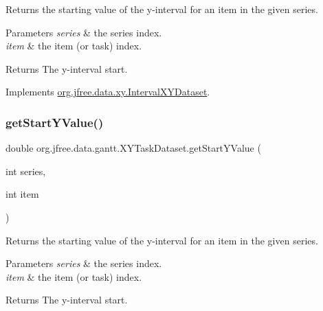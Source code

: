 Returns the starting value of the y-\/interval for an item in the given series.


\begin{DoxyParams}{Parameters}
{\em series} & the series index. \\
\hline
{\em item} & the item (or task) index.\\
\hline
\end{DoxyParams}
\begin{DoxyReturn}{Returns}
The y-\/interval start. 
\end{DoxyReturn}


Implements \mbox{\hyperlink{interfaceorg_1_1jfree_1_1data_1_1xy_1_1_interval_x_y_dataset_afdd414735adb233734bc35b76a005ed9}{org.\+jfree.\+data.\+xy.\+Interval\+X\+Y\+Dataset}}.

\mbox{\label{classorg_1_1jfree_1_1data_1_1gantt_1_1_x_y_task_dataset_a72a8034b2b668697fe4fb144f38f3806}} 
\subsubsection{\texorpdfstring{get\+Start\+Y\+Value()}{getStartYValue()}}
{\footnotesize\ttfamily double org.\+jfree.\+data.\+gantt.\+X\+Y\+Task\+Dataset.\+get\+Start\+Y\+Value (\begin{DoxyParamCaption}\item[{int}]{series,  }\item[{int}]{item }\end{DoxyParamCaption})}

Returns the starting value of the y-\/interval for an item in the given series.


\begin{DoxyParams}{Parameters}
{\em series} & the series index. \\
\hline
{\em item} & the item (or task) index.\\
\hline
\end{DoxyParams}
\begin{DoxyReturn}{Returns}
The y-\/interval start. 
\end{DoxyReturn}


